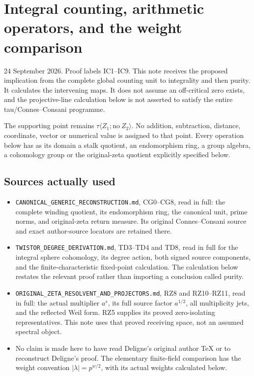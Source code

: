 \documentclass[
]{article}
\providecommand{\tightlist}{%
  \setlength{\itemsep}{0pt}\setlength{\parskip}{0pt}}
\begin{document}
\section{Integral counting, arithmetic operators, and the weight
comparison}\label{integral-counting-arithmetic-operators-and-the-weight-comparison}

24 September 2026. Proof labels IC1--IC9. This note receives the
proposed implication from the complete global counting unit to
integrality and then purity. It calculates the intervening maps. It does
not assume an off-critical zero exists, and the projective-line
calculation below is not asserted to satisfy the entire
tau/Connes--Consani programme.

The supporting point remains
\(\tau\langle Z_1;\mathrm{no}\ Z_2\rangle\). No addition, subtraction,
distance, coordinate, vector or numerical value is assigned to that
point. Every operation below has as its domain a stalk quotient, an
endomorphism ring, a group algebra, a cohomology group or the
original-zeta quotient explicitly specified below.

\subsection{Sources actually used}\label{sources-actually-used}

\begin{itemize}
\tightlist
\item
  \nolinkurl{CANONICAL_GENERIC_RECONSTRUCTION.md}, CG0--CG8, read in
  full: the complete winding quotient, its endomorphism ring, the
  canonical unit, prime norms, and original-zeta return measure. Its
  original Connes--Consani source and exact author-source locators are
  retained there.
\item
  \texttt{TWISTOR\_DEGREE\_DERIVATION.md}, TD3--TD4 and TD8, read in
  full for the integral sphere cohomology, its degree action, both
  signed source components, and the finite-characteristic fixed-point
  calculation. The calculation below restates the relevant proof rather
  than importing a conclusion called purity.
\item
  \nolinkurl{ORIGINAL_ZETA_RESOLVENT_AND_PROJECTORS.md}, RZ8 and
  RZ10--RZ11, read in full: the actual multiplier \(a^s\), its full
  source factor \(a^{1/2}\), all multiplicity jets, and the reflected
  Weil form. RZ5 supplies its proved zero-isolating representatives.
  This note uses that proved receiving space, not an assumed spectral
  object.
\item
  No claim is made here to have read Deligne's original author TeX or to
  reconstruct Deligne's proof. The elementary finite-field comparison
  has the weight convention \(|\lambda|=p^{w/2}\), with its actual
  weights calculated below.
\end{itemize}
\end{document}
